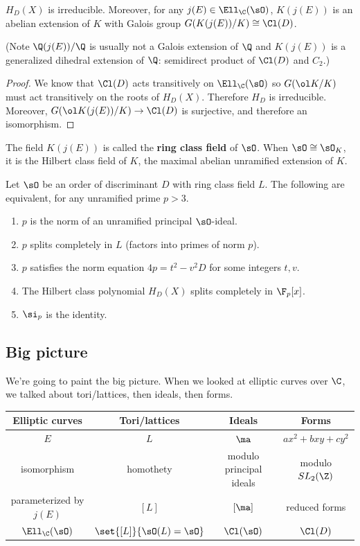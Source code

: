 \begin{thm}
$H_D(X)$ is irreducible. Moreover, for any $j(E)\in \Ell_{\C}(\sO)$, $K(j(E))$ is an abelian extension of $K$ with Galois group $G(K(j(E))/K)\cong \Cl(D)$. 
\end{thm}
(Note $\Q(j(E))/\Q$ is usually not a Galois extension of $\Q$ and $K(j(E))$ is a generalized dihedral extension of $\Q$: semidirect product of $\Cl(D)$ and $C_2$.)
\begin{proof}
We know that $\Cl(D)$ acts transitively on $\Ell_{\C}(\sO)$ so $G(\ol K/K)$ must act transitively on the roots of $H_D(X)$. Therefore $H_D$ is irreducible. Moreover, $G(\ol K(j(E))/K)\to \Cl(D)$ is surjective, and therefore an isomorphism.
\end{proof}
The field $K(j(E))$ is called the \textbf{ring class field} of $\sO$. When $\sO\cong \sO_K$, it is the Hilbert class field of $K$, the maximal abelian unramified extension of $K$.
\begin{thm}
Let $\sO$ be an order of discriminant $D$ with ring class field $L$. The following are equivalent, for any unramified prime $p>3$.
\begin{enumerate}
\item
$p$ is the norm of an unramified principal $\sO$-ideal.
\item
$p$ splits completely in $L$ (factors into primes of norm $p$).
\item
$p$ satisfies the norm equation $4p=t^2-v^2D$ for some integers $t,v$.
\item
The Hilbert class polynomial $H_D(X)$ splits completely in $\F_p[x]$.
\item
$\si_p$ is the identity.
\end{enumerate}
\end{thm}
\subsection{Big picture}
We're going to paint the big picture.
When we looked at elliptic curves over $\C$, we talked about tori/lattices, then ideals, then forms.

\begin{tabular}{|c|c|c|c|}
\hline 
Elliptic curves & Tori/lattices & Ideals & Forms\tabularnewline
\hline 
\hline 
$E$ & $L$ & $\ma$ & $ax^{2}+bxy+cy^{2}$\tabularnewline
\hline 
isomorphism & homothety & modulo principal ideals & modulo $SL_{2}(\Z)$\tabularnewline
\hline 
parameterized by $j(E)$ & $[L]$ & $[\ma]$ & reduced forms\tabularnewline
\hline 
$\Ell_{\C}(\sO)$ & $\set{[L]}{\sO(L)=\sO}$ & $\Cl(\sO)$ & $\Cl(D)$\tabularnewline
\hline 
\end{tabular}

